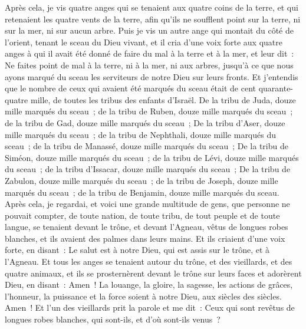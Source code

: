 \begin{multicols}{2}
\VerseOne{}Après cela, je vis quatre anges qui se tenaient aux quatre coins de la terre, et qui retenaient les quatre vents de la terre, afin qu'ils ne soufflent point sur la terre, ni sur la mer, ni sur aucun arbre.
Puis je vis un autre ange qui montait du côté de l'orient, tenant le sceau du Dieu vivant, et il cria d'une voix forte aux quatre anges à qui il avait été donné de faire du mal à la terre et à la mer,
et leur dit~: Ne faites point de mal à la terre, ni à la mer, ni aux arbres, jusqu'à ce que nous ayons marqué du sceau les serviteurs de notre Dieu sur leurs fronts.
Et j'entendis que le nombre de ceux qui avaient été marqués du sceau était de cent quarante-quatre mille, de toutes les tribus des enfants d'Israël.
De la tribu de Juda, douze mille marqués du sceau~; de la tribu de Ruben, douze mille marqués du sceau~; de la tribu de Gad, douze mille marqués du sceau~;
De la tribu d'Aser, douze mille marqués du sceau~; de la tribu de Nephthali, douze mille marqués du sceau~; de la tribu de Manassé, douze mille marqués du sceau~;
De la tribu de Siméon, douze mille marqués du sceau~; de la tribu de Lévi, douze mille marqués du sceau~; de la tribu d'Issacar, douze mille marqués du sceau~;
De la tribu de Zabulon, douze mille marqués du sceau~; de la tribu de Joseph, douze mille marqués du sceau~; de la tribu de Benjamin, douze mille marqués du sceau.
Après cela, je regardai, et voici une grande multitude de gens, que personne ne pouvait compter, de toute nation, de toute tribu, de tout peuple et de toute langue, se tenaient devant le trône, et devant l'Agneau, vêtus de longues robes blanches, et ils avaient des palmes dans leurs mains.
Et ils criaient d'une voix forte, en disant~: Le salut est à notre Dieu, qui est assis sur le trône, et à l'Agneau.
Et tous les anges se tenaient autour du trône, et des vieillards, et des quatre animaux, et ils se prosternèrent devant le trône sur leurs faces et adorèrent Dieu,
en disant~: Amen~! La louange, la gloire, la sagesse, les actions de grâces, l'honneur, la puissance et la force soient à notre Dieu, aux siècles des siècles. Amen~!
Et l'un des vieillards prit la parole et me dit~: Ceux qui sont revêtus de longues robes blanches, qui sont-ils, et d'où sont-ils venus~?

\end{multicols}
